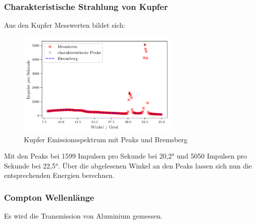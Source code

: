 \subsubsection{Charakteristische Strahlung von Kupfer}
Aus den Kupfer Messwerten bildet sich:
\begin{figure}[H]
    \centering
    \includegraphics[width=0.7\textwidth]{plots/CU_Spektrum.pdf}
    \caption{Kupfer Emissionsspektrum mit Peaks und Bremsberg}
    \label{fig:CU_Spektrum}
\end{figure}
Mit den Peaks bei 1599 Impulsen pro Sekunde bei 20,2° und 5050 Impulsen pro Sekunde bei 22,5°.
Über die abgelesenen Winkel an den Peaks lassen sich nun die entsprechenden Energien berechnen.


\subsubsection{Compton Wellenlänge}
Es wird die Transmission von Aluminium gemessen.
